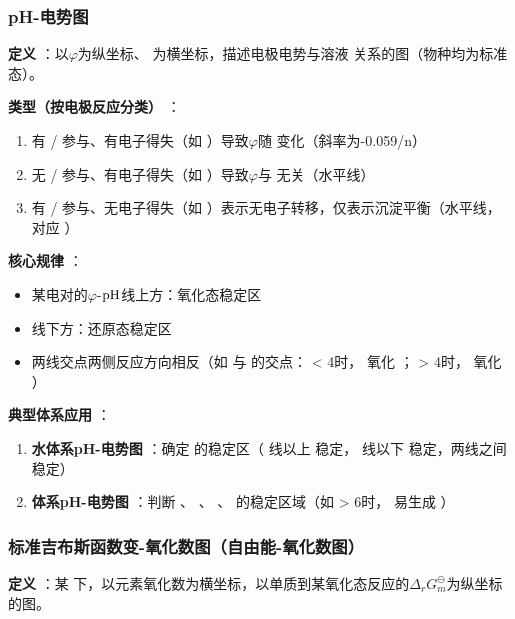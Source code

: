 \subsubsection{pH-电势图} 
\textbf{定义} ：以\( \varphi \)为纵坐标、  为横坐标，描述电极电势与溶液  关系的图（物种均为标准态）。

\textbf{类型（按电极反应分类）} ：
\begin{enumerate} 
    \item 有  /  参与、有电子得失（如  ）导致\( \varphi \)随  变化（斜率为-0.059/n）
    \item 无  /  参与、有电子得失（如  ）导致\( \varphi \)与  无关（水平线）
    \item 有  /  参与、无电子得失（如  ）表示无电子转移，仅表示沉淀平衡（水平线，对应  ）
\end{enumerate} 

\textbf{核心规律} ：
\begin{itemize} 
    \item 某电对的\( \varphi \)-\( \ce{pH} \)线上方：氧化态稳定区
    \item 线下方：还原态稳定区
    \item 两线交点两侧反应方向相反（如  与  的交点：   < 4时，  氧化  ；   > 4时，  氧化  ）
\end{itemize} 

\textbf{典型体系应用} ：
\begin{enumerate} 
    \item \textbf{水体系pH-电势图} ：确定  的稳定区（  线以上  稳定，  线以下  稳定，两线之间  稳定）
    \item \textbf{  体系pH-电势图} ：判断  、  、  、  的稳定区域（如   > 6时，  易生成  ）
\end{enumerate} 

\subsubsection{标准吉布斯函数变-氧化数图（自由能-氧化数图）} 
\textbf{定义} ：某  下，以元素氧化数为横坐标，以单质到某氧化态反应的\( \Delta_r G_m^\ominus \)为纵坐标的图。

